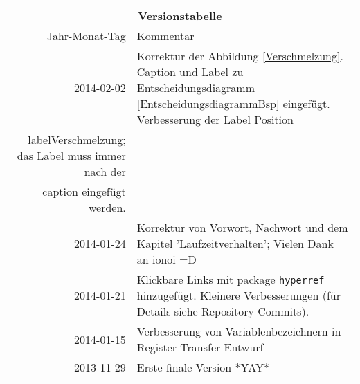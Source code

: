 \begin{table}[htp]
\centering
\begin{tabularx}{\columnwidth}{rp{}}
\multicolumn{2}{c}{\textbf{Versionstabelle}} \\
Jahr-Monat-Tag & Kommentar \\ \hline
2014-02-02 & Korrektur der Abbildung \ref{Verschmelzung}.
Caption und Label zu Entscheidungsdiagramm \ref{EntscheidungsdiagrammBsp} eingefügt.
Verbesserung der Label Position \\label{Verschmelzung}; das Label muss immer nach der \\caption eingefügt werden.
\\
2014-01-24 & Korrektur von Vorwort, Nachwort und dem Kapitel 'Laufzeitverhalten'; Vielen Dank an ionoi =D \\
2014-01-21 & Klickbare Links mit package \texttt{hyperref} hinzugefügt.
                     Kleinere Verbesserungen (für Details siehe Repository Commits).
\\
2014-01-15 & Verbesserung von Variablenbezeichnern in Register Transfer Entwurf \\
2013-11-29 & Erste finale Version *YAY* \\
\end{tabularx}
\end{table}
